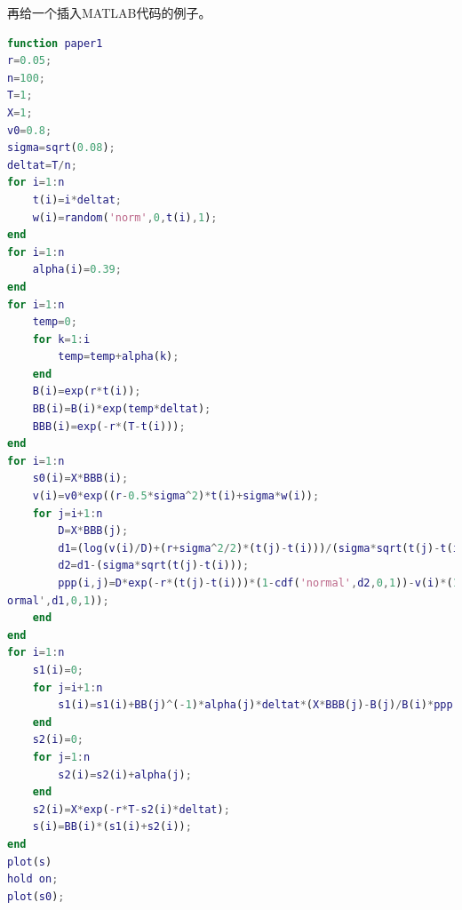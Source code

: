 再给一个插入MATLAB代码的例子。

\begin{lstlisting}[language={matlab}, caption={一段MATLAB源代码}]
function paper1
r=0.05;
n=100;
T=1;
X=1;
v0=0.8;
sigma=sqrt(0.08);
deltat=T/n;
for i=1:n
    t(i)=i*deltat;
    w(i)=random('norm',0,t(i),1);
end
for i=1:n
    alpha(i)=0.39;
end
for i=1:n
    temp=0;
    for k=1:i
        temp=temp+alpha(k);
    end
    B(i)=exp(r*t(i));
    BB(i)=B(i)*exp(temp*deltat);
    BBB(i)=exp(-r*(T-t(i)));
end
for i=1:n
    s0(i)=X*BBB(i);
    v(i)=v0*exp((r-0.5*sigma^2)*t(i)+sigma*w(i));
    for j=i+1:n
        D=X*BBB(j);
        d1=(log(v(i)/D)+(r+sigma^2/2)*(t(j)-t(i)))/(sigma*sqrt(t(j)-t(i)));
        d2=d1-(sigma*sqrt(t(j)-t(i)));
        ppp(i,j)=D*exp(-r*(t(j)-t(i)))*(1-cdf('normal',d2,0,1))-v(i)*(1-cdf('n
ormal',d1,0,1));
    end
end
for i=1:n
    s1(i)=0;
    for j=i+1:n
        s1(i)=s1(i)+BB(j)^(-1)*alpha(j)*deltat*(X*BBB(j)-B(j)/B(i)*ppp(i,j));
    end
    s2(i)=0;
    for j=1:n
        s2(i)=s2(i)+alpha(j);
    end
    s2(i)=X*exp(-r*T-s2(i)*deltat);
    s(i)=BB(i)*(s1(i)+s2(i));
end
plot(s)
hold on;
plot(s0);
\end{lstlisting}
